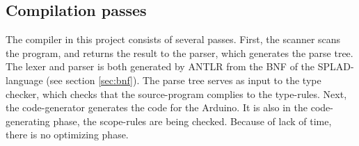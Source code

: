 \subsection{Compilation passes}
The compiler in this project consists of several passes. First, the scanner scans the program, and returns the result to the parser, which generates the parse tree. The lexer and parser is both generated by ANTLR \citep{ANTLR} from the BNF of the SPLAD-language (see section \ref{sec:bnf}). The parse tree serves as input to the type checker, which checks that the source-program complies to the type-rules. Next, the code-generator generates the code for the Arduino. It is also in the code-generating phase, the scope-rules are being checked. Because of lack of time, there is no optimizing phase. 